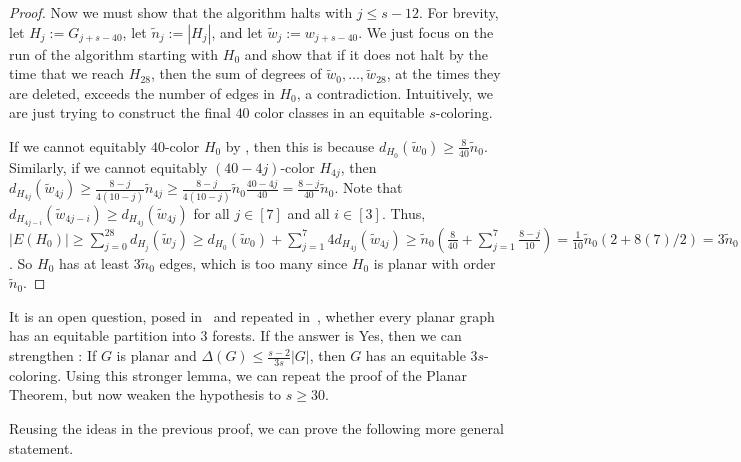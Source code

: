 \documentclass[11pt]{article}
\theoremstyle{definition}
\renewcommand\ge\geqslant
\renewcommand\le\leqslant
\begin{document}
\begin{proof}
	Now we must show that the algorithm halts with $j\le s-12$.  For brevity, let $H_j:=G_{j+s-40}$, let $\tilde{n}_j:=|H_j|$, and let 
	$\tilde{w}_j:=w_{j+s-40}$.  We just focus on the run of the algorithm starting with $H_0$ and show that if it does not halt by
	the time that we reach $H_{28}$, then the sum of degrees of $\tilde{w}_0,\ldots,\tilde{w}_{28}$, at the times they are deleted, 
	exceeds the number of edges in $H_0$, a contradiction.
	Intuitively, we are just trying to construct the final $40$ color classes in an equitable $s$-coloring.

	If we cannot equitably $40$-color $H_0$ by , then this is because $d_{H_0}(\tilde{w}_0)\ge \frac{8}{40}\tilde{n}_0$.
	Similarly, if we cannot equitably $(40-4j)$-color $H_{4j}$, then $d_{H_{4j}}(\tilde{w}_{4j})\ge
	\frac{8-j}{4(10-j)}\tilde{n}_{4j}\ge \frac{8-j}{4(10-j)}\tilde{n}_{0}\frac{40-4j}{40} = \frac{8-j}{40}\tilde{n}_0$.
	Note that $d_{H_{4j-i}}(\tilde{w}_{4j-i})\ge d_{H_{4j}}(\tilde{w}_{4j})$ for all $j\in[7]$ and all $i\in [3]$.
	Thus, $|E(H_0)| \ge \sum_{j=0}^{28}d_{H_j}(\tilde{w}_j)\ge
	d_{H_0}(\tilde{w}_0) + \sum_{j=1}^{7}4d_{H_{4j}}(\tilde{w}_{4j}) \ge \tilde{n}_0\left(\frac8{40}+\sum_{j=1}^7\frac{8-j}{10}\right) 
	= \frac1{10}\tilde{n}_0\left(2 + 8(7)/2\right) = 3\tilde{n}_0$.
        So $H_0$ has at least $3\tilde{n}_0$ edges, which is too many since $H_0$ is planar with order~$\tilde{n}_0$. 
\end{proof}

It is an open question, posed in~\cite{ELM} and repeated in~\cite{KKX-survey,KOZ}, whether every planar graph has an equitable partition into $3$ forests.
If the answer is Yes, then we can strengthen : If $G$ is planar and $\Delta(G)\le \frac{s-2}{3s}|G|$, then $G$ has an equitable $3s$-coloring.
Using this stronger lemma, we can repeat the proof of the Planar Theorem, but now weaken the hypothesis to $s\ge 30$.

Reusing the ideas in the previous proof, we can prove the following more general statement.
\end{document}
